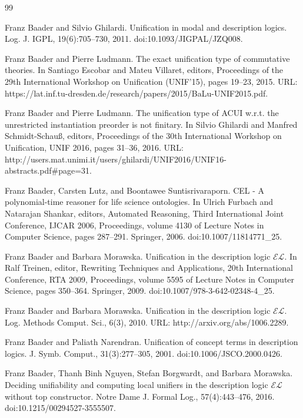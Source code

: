\documentclass[10pt,a4paper]{amsart}
\begin{document}
\begin{thebibliography}{99}
\par\noindent  [8]  Franz Baader and Silvio Ghilardi.  Unification in modal and description logics.  Log. J. IGPL, 19(6):705–730, 2011.  doi:10.1093/JIGPAL/JZQ008.  
 
\par\noindent  [9]  Franz Baader and Pierre Ludmann.  The exact unification type of commutative theories.  In Santiago Escobar and Mateu Villaret, editors, Proceedings of the 29th International Workshop on Unification (UNIF’15), pages 19–23, 2015.  URL: https://lat.inf.tu-dresden.de/research/papers/2015/BaLu-UNIF2015.pdf.  
 
\par\noindent  [10]  Franz Baader and Pierre Ludmann.  The unification type of ACUI w.r.t. the unrestricted instantiation preorder is not finitary.  In Silvio Ghilardi and Manfred Schmidt-Schauß, editors, Proceedings of the 30th International Workshop on Unification, UNIF 2016, pages 31–36, 2016.  URL: http://users.mat.unimi.it/users/ghilardi/UNIF2016/UNIF16-abstracts.pdf\#page=31.  
 
\par\noindent  [11]  Franz Baader, Carsten Lutz, and Boontawee Suntisrivaraporn.  CEL - A polynomial-time reasoner for life science ontologies.  In Ulrich Furbach and Natarajan Shankar, editors, Automated Reasoning, Third International Joint Conference, IJCAR 2006, Proceedings, volume 4130 of Lecture Notes in Computer Science, pages 287–291. Springer, 2006.  doi:10.1007/11814771\_25.  
 
\par\noindent  [12]  Franz Baader and Barbara Morawska.  Unification in the description logic $\mathcal{EL}$.  In Ralf Treinen, editor, Rewriting Techniques and Applications, 20th International Conference, RTA 2009, Proceedings, volume 5595 of Lecture Notes in Computer Science, pages 350–364. Springer, 2009.  doi:10.1007/978-3-642-02348-4\_25.  
 
\par\noindent  [13]  Franz Baader and Barbara Morawska.  Unification in the description logic $\mathcal{EL}$.  Log. Methods Comput. Sci., 6(3), 2010.  URL: http://arxiv.org/abs/1006.2289.  
 
\par\noindent  [14]  Franz Baader and Paliath Narendran.  Unification of concept terms in description logics.  J. Symb. Comput., 31(3):277–305, 2001.  doi:10.1006/JSCO.2000.0426.  
 
\par\noindent  [15]  Franz Baader, Thanh Binh Nguyen, Stefan Borgwardt, and Barbara Morawska.  Deciding unifiability and computing local unifiers in the description logic $\mathcal{EL}$ without top constructor.  Notre Dame J. Formal Log., 57(4):443–476, 2016.  doi:10.1215/00294527-3555507.  
 

\end{thebibliography}
\end{document}
